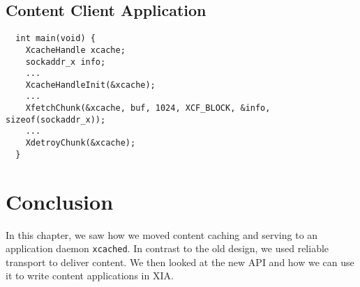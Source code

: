 \subsection{Content Client Application}
\label{sec:content_client_app}
      {
\begin{verbatim}
  int main(void) {
    XcacheHandle xcache;
    sockaddr_x info;
    ...
    XcacheHandleInit(&xcache);
    ...
    XfetchChunk(&xcache, buf, 1024, XCF_BLOCK, &info, sizeof(sockaddr_x));
    ...
    XdetroyChunk(&xcache);
  }
\end{verbatim}
}
\section{Conclusion}
In this chapter, we saw how we moved content caching and serving to an
application daemon \texttt{xcached}. In contrast to the old design, we
used reliable transport to deliver content. We then looked at the new
API and how we can use it to write content applications in XIA.
